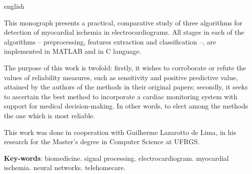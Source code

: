 
\begin{resumo}[Abstract]
\begin{otherlanguage*}{english}

\setlength{\parindent}{0.6cm}

This monograph presents a practical, comparative study of three algorithms for detection of myocardial ischemia in electrocardiograms. All stages in each of the algorithms -- preprocessing, features extraction and classification --, are implemented in MATLAB and in C language.

The purpose of this work is twofold: firstly, it wishes to corroborate or refute the values of reliability measures, such as sensitivity and positive predictive value, attained by the authors of the methods in their original papers; secondly, it seeks to ascertain the best method to incorporate a cardiac monitoring system with support for medical decision-making. In other words, to elect among the methods the one which is most reliable.

This work was done in cooperation with Guilherme Lazarotto de Lima, in his research for the Master's degree in Computer Science at UFRGS.


\null\vfill
\textbf{Key-words}: biomedicine. signal processing. electrocardiogram. myocardial ischemia. neural networks. telehomecare.

\end{otherlanguage*}
\end{resumo}